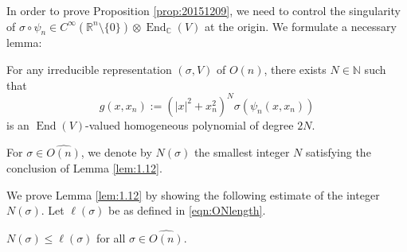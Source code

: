 In order to prove Proposition \ref{prop:20151209}, 
 we need to control the singularity
 of $\sigma \circ \psi_n \in C^{\infty}({\mathbb{R}}^n \setminus \{0\}) \otimes
 {\operatorname{End}}_{\mathbb{C}}(V)$
 at the origin.  
We formulate a necessary lemma:
\begin{lemma}
\label{lem:1.12}
For any irreducible representation $(\sigma, V)$ of $O(n)$, 
 there exists $N \in {\mathbb{N}}$ 
such that
\[
  g(x,x_n):= (|x|^2+x_n^2)^{N} \sigma(\psi_n(x,x_n))
\]
 is an $\operatorname{End}(V)$-valued homogeneous polynomial of degree $2N$.  
\end{lemma}

\begin{definition}
\label{def:Nsigma}
For $\sigma \in \widehat {O(n)}$, 
 we denote by 
$N(\sigma)$
  the smallest integer $N$
 satisfying the conclusion of Lemma \ref{lem:1.12}.  
\end{definition}

We prove Lemma \ref{lem:1.12}
 by showing the following estimate of the integer $N(\sigma)$.  
Let $\ell(\sigma)$ be as defined in \eqref{eqn:ONlength}.  

\begin{lemma}
\label{lem:Nsigma}
$N(\sigma) \le \ell(\sigma)$
 for all $\sigma \in \widehat {O(n)}$.  
\end{lemma}

